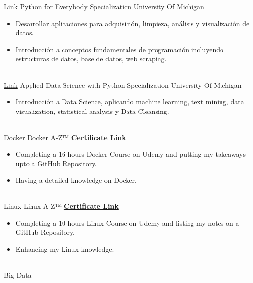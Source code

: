 \documentclass[letterpaper]{DS_class_file} %
\begin{document}
\begin{twenty} %
    \twentyitem
   {\href{https://www.coursera.org/specializations/python?page=7}{Link}}
	{}
	{\hspace{0.01cm}Python for Everybody Specialization}
	{University Of Michigan}
	{}
	{
		{\begin{itemize}
				\item Desarrollar aplicaciones para adquisición, limpieza, análisis y visualización de datos.
				\item Introducción a conceptos fundamentales de programación incluyendo estructuras de datos, base de datos, web scraping.
		\end{itemize}}
	}
	\\
	\twentyitem
	{\href{https://www.coursera.org/specializations/data-science-python}{Link}}
	{}
	{\hspace{0.01cm}Applied Data Science with Python Specialization}
	{University Of Michigan}
	{}
	{
		{\begin{itemize}
				\item Introducción a Data Science, aplicando machine learning, text mining, data visualization, statistical analysis  y Data Cleansing. 
		\end{itemize}}
	}
	\\
	\twentyitem
	{Docker}
	{}
	{\hspace{0.3cm}Docker A-Z™}
	{\href{https://www.udemy.com/certificate/UC-c1ab98de-9803-452b-9166-8ef3ae797e5a/}{\textbf{Certificate Link}}}
	{}
	{
		{\begin{itemize}
				\item Completing a 16-hours Docker Course on Udemy and putting my takeaways upto a GitHub Repository.
				\item Having a detailed knowledge on Docker.
		\end{itemize}}
	}
	\\
	\twentyitem
	{Linux}
	{}
	{\hspace{0.3cm}Linux A-Z™}
	{\href{https://www.udemy.com/certificate/UC-74719d94-89af-44ba-ab2d-4299dd2ec3dd/}{\textbf{Certificate Link}}}
	{}
	{
		{\begin{itemize}
				\item Completing a 10-hours Linux Course on Udemy and listing my notes on a GitHub Repository.
				\item Enhancing my Linux knowledge.
		\end{itemize}}
	}
	\\
	\twentyitem
	{Big Data}
	{}

\end{twenty}
\end{document}

